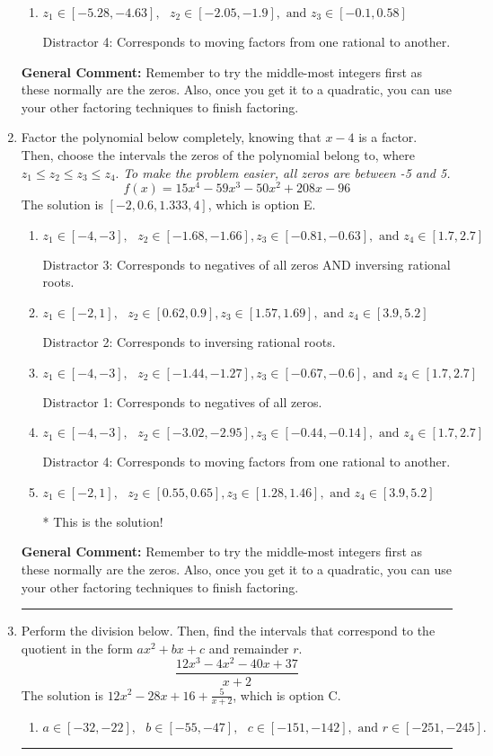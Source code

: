 \documentclass{extbook}[14pt]
\newcommand{\litem}[1]{\item #1

\rule{\textwidth}{0.4pt}}
\begin{document}
\begin{enumerate}
{\begin{enumerate}[label=\Alph*.]
* This is the solution!
\item \( z_1 \in [-5.28, -4.63], \text{   }  z_2 \in [-2.05, -1.9], \text{   and   } z_3 \in [-0.1, 0.58] \)

 Distractor 4: Corresponds to moving factors from one rational to another.
\end{enumerate}

\textbf{General Comment:} Remember to try the middle-most integers first as these normally are the zeros. Also, once you get it to a quadratic, you can use your other factoring techniques to finish factoring.
}
\litem{
Factor the polynomial below completely, knowing that $x -4$ is a factor. Then, choose the intervals the zeros of the polynomial belong to, where $z_1 \leq z_2 \leq z_3 \leq z_4$. \textit{To make the problem easier, all zeros are between -5 and 5.}
\[ f(x) = 15x^{4} -59 x^{3} -50 x^{2} +208 x -96 \]The solution is \( [-2, 0.6, 1.333, 4] \), which is option E.\begin{enumerate}[label=\Alph*.]
\item \( z_1 \in [-4, -3], \text{   }  z_2 \in [-1.68, -1.66], z_3 \in [-0.81, -0.63], \text{   and   } z_4 \in [1.7, 2.7] \)

 Distractor 3: Corresponds to negatives of all zeros AND inversing rational roots.
\item \( z_1 \in [-2, 1], \text{   }  z_2 \in [0.62, 0.9], z_3 \in [1.57, 1.69], \text{   and   } z_4 \in [3.9, 5.2] \)

 Distractor 2: Corresponds to inversing rational roots.
\item \( z_1 \in [-4, -3], \text{   }  z_2 \in [-1.44, -1.27], z_3 \in [-0.67, -0.6], \text{   and   } z_4 \in [1.7, 2.7] \)

 Distractor 1: Corresponds to negatives of all zeros.
\item \( z_1 \in [-4, -3], \text{   }  z_2 \in [-3.02, -2.95], z_3 \in [-0.44, -0.14], \text{   and   } z_4 \in [1.7, 2.7] \)

 Distractor 4: Corresponds to moving factors from one rational to another.
\item \( z_1 \in [-2, 1], \text{   }  z_2 \in [0.55, 0.65], z_3 \in [1.28, 1.46], \text{   and   } z_4 \in [3.9, 5.2] \)

* This is the solution!
\end{enumerate}

\textbf{General Comment:} Remember to try the middle-most integers first as these normally are the zeros. Also, once you get it to a quadratic, you can use your other factoring techniques to finish factoring.
}
\litem{
Perform the division below. Then, find the intervals that correspond to the quotient in the form $ax^2+bx+c$ and remainder $r$.
\[ \frac{12x^{3} -4 x^{2} -40 x + 37}{x + 2} \]The solution is \( 12x^{2} -28 x + 16 + \frac{5}{x + 2} \), which is option C.\begin{enumerate}[label=\Alph*.]
\item \( a \in [-32, -22], \text{   } b \in [-55, -47], \text{   } c \in [-151, -142], \text{   and   } r \in [-251, -245]. \)


\end{enumerate}}
\end{enumerate}
\end{document}
